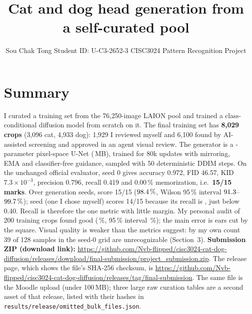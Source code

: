 \documentclass[10pt]{article}
\title{\vspace{-0.9cm}\textbf{Cat and dog head generation from a self-curated pool}\vspace{-0.1cm}}
\author{Sou Chak Tong \quad Student ID: U-C3-2652-3 \quad CISC3024 Pattern Recognition Project}
\date{}
\newcommand{\zipurl}{https://github.com/Nvb-flipped/cisc3024-cat-dog-diffusion/releases/download/final-submission/project_submission.zip}
\newcommand{\releaseurl}{https://github.com/Nvb-flipped/cisc3024-cat-dog-diffusion/releases/tag/final-submission}
\begin{document}
\maketitle\vspace{-0.9cm}

\section*{Summary}
I curated a training set from the 76{,}250-image LAION pool and trained a class-conditional diffusion model from scratch on it.
The final training set has \textbf{8{,}029 crops} (3{,}096 cat, 4{,}933 dog): 1{,}929 I reviewed myself and 6{,}100 found by AI-assisted screening and approved in an agent visual review.
The generator is a \params-parameter pixel-space U-Net (\sizeMB\,MB), trained for 80k updates with mirroring, EMA and classifier-free guidance, sampled with 50 deterministic DDIM steps.
On the unchanged official evaluator, seed 0 gives accuracy 0.972, FID 46.57, KID $7.3{\times}10^{-3}$, precision 0.796, recall 0.419 and 0.00\,\% memorization, i.e.\ \textbf{15/15 marks}.
Over \nSeeds{} generation seeds, \nFifteen{} score 15/15 ($98.4\,\%$, Wilson 95\,\% interval $91.3$--$99.7\,\%$); seed \lowSeed{} (one I chose myself) scores 14/15 because its recall is \lowRecall{}, just below 0.40.
Recall is therefore the one metric with little margin. My personal audit of 200 training crops found \auditGood{} good (\auditPct\,\%, 95\,\% interval \auditCI\,\%); the main error is ears cut by the square.
Visual quality is weaker than the metrics suggest: by my own count 39 of 128 samples in the seed-0 grid are unrecognizable (Section~3).
\textbf{Submission ZIP (download link):} \expandafter\url\expandafter{\zipurl}. The release page, which shows the file's SHA-256 checksum, is \expandafter\url\expandafter{\releaseurl}. The same file is the Moodle upload (under 100\,MB); three large raw curation tables are a second asset of that release, listed with their hashes in \texttt{results/release/omitted\_bulk\_files.json}.
\end{document}
